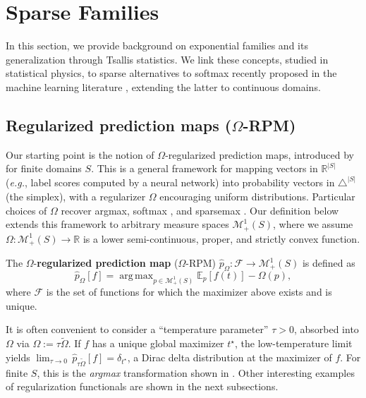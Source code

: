 \documentclass{article}
\DeclareMathOperator*{\argmax}{arg\,max}
\begin{document}
\section{Sparse Families}\label{sec:sparse_families}

In this section, we provide background on exponential families and its generalization through Tsallis statistics. We link these concepts, studied in statistical physics, 
to sparse alternatives to softmax recently 
proposed in the machine learning literature \citep{Martins2016ICML,peters2019sparse}, extending 
the latter to continuous domains. 

\subsection{Regularized prediction maps ($\Omega$-RPM)}

Our starting point is the notion of $\Omega$-regularized prediction maps, introduced by \citet{blondel2020learning} for finite domains $S$. 
This is a general framework for mapping vectors in $\mathbb{R}^{|S|}$ (\textit{e.g.}, label scores computed by a neural network) into probability vectors in $\triangle^{|S|}$ (the simplex), with a regularizer $\Omega$ encouraging uniform distributions. Particular choices of $\Omega$ recover argmax, softmax \citep{bridle1990probabilistic}, and sparsemax \citep{Martins2016ICML}. Our definition below extends this framework to arbitrary measure spaces $\mathcal{M}_+^1(S)$, where we assume  $\Omega: \mathcal{M}_+^1(S) \rightarrow \mathbb{R}$ is a lower semi-continuous,  proper, and strictly convex function.

\vspace{0.1cm}
\begin{definition}
\label{def:regularized_prediction}
The $\Omega$-\textbf{regularized prediction map} ($\Omega$-RPM) $\hat{p}_{\Omega}: \mathcal{F} \rightarrow \mathcal{M}_+^1(S)$ is defined as
\begin{equation}\label{eq:reg_prediction}
\hat{p}_{\Omega}[f] = \argmax_{p \in \mathcal{M}_+^1(S)} \mathbb{E}_{p}[f(t)] - \Omega(p),
\end{equation}
where $\mathcal{F}$ is the set of functions for which the maximizer above exists and is unique.
\end{definition}

It is often convenient to consider a ``temperature parameter'' $\tau>0$, absorbed into $\Omega$ via $\Omega := \tau \tilde{\Omega}$. If $f$ has a unique global maximizer $t^\star$, the low-temperature limit yields ${ \lim_{\tau\rightarrow 0}}\, \hat{p}_{\tau \tilde{\Omega}}[f] = \delta_{t^\star}$,
a Dirac delta distribution at the maximizer of $f$. 
For finite $S$, this is the {\it argmax} transformation shown in \citep{blondel2020learning}. 
Other interesting examples of regularization functionals are shown in the next subsections.
\end{document}
